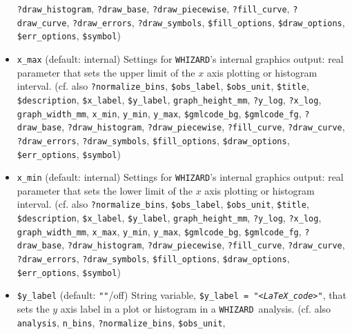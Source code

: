 \documentclass[12pt]{book}
\newcommand{\ttt}[1]{\texttt{#1}}
\newcommand{\whizard}{\texttt{WHIZARD}}
\begin{document}
\begin{itemize}
\ttt{?draw\_histogram}, \ttt{?draw\_base}, \ttt{?draw\_piecewise},
\newline \ttt{?fill\_curve}, \ttt{?draw\_curve}, \ttt{?draw\_errors},
\ttt{?draw\_symbols}, \ttt{\$fill\_options}, \newline \ttt{\$draw\_options},
\ttt{\$err\_options}, \ttt{\$symbol})
\item
\ttt{x\_max} \qquad (default: internal) \newline
Settings for \whizard's internal graphics output: real parameter that
sets the upper limit of the $x$ axis plotting or histogram interval. (cf. also
\ttt{?normalize\_bins}, \ttt{\$obs\_label}, \ttt{\$obs\_unit},
\ttt{\$title}, \ttt{\$description}, \ttt{\$x\_label},
\ttt{\$y\_label}, \ttt{graph\_height\_mm}, \ttt{?y\_log},
\newline \ttt{?x\_log}, \ttt{graph\_width\_mm}, \ttt{x\_min},
\ttt{y\_min}, \ttt{y\_max}, \ttt{\$gmlcode\_bg}, \ttt{\$gmlcode\_fg},
\ttt{?draw\_base}, \newline \ttt{?draw\_histogram}, \ttt{?draw\_piecewise},
\ttt{?fill\_curve}, \ttt{?draw\_curve}, \ttt{?draw\_errors},
\newline \ttt{?draw\_symbols}, \ttt{\$fill\_options}, \ttt{\$draw\_options},
\ttt{\$err\_options}, \ttt{\$symbol})
\item
\ttt{x\_min} \qquad (default: internal) \newline
Settings for \whizard's internal graphics output: real parameter that
sets the lower limit of the $x$ axis plotting or histogram interval. (cf. also
\ttt{?normalize\_bins}, \ttt{\$obs\_label}, \ttt{\$obs\_unit},
\ttt{\$title}, \ttt{\$description}, \ttt{\$x\_label},
\ttt{\$y\_label}, \ttt{graph\_height\_mm}, \ttt{?y\_log},
\newline \ttt{?x\_log}, \ttt{graph\_width\_mm}, \ttt{x\_max},
\ttt{y\_min}, \ttt{y\_max}, \ttt{\$gmlcode\_bg}, \ttt{\$gmlcode\_fg},
\ttt{?draw\_base}, \newline \ttt{?draw\_histogram}, \ttt{?draw\_piecewise},
\ttt{?fill\_curve}, \ttt{?draw\_curve}, \ttt{?draw\_errors},
\newline \ttt{?draw\_symbols}, \ttt{\$fill\_options}, \ttt{\$draw\_options},
\ttt{\$err\_options}, \ttt{\$symbol})
\item
\ttt{\$y\_label} \qquad (default: \ttt{""}/off) \newline
String variable, \ttt{\$y\_label = "{\em <LaTeX\_code>}"}, that sets the $y$
axis label in a plot or histogram in a \whizard\ analysis. 
(cf. also \ttt{analysis}, 
\ttt{n\_bins}, \ttt{?normalize\_bins}, \ttt{\$obs\_unit},

\end{itemize}
\end{document}

